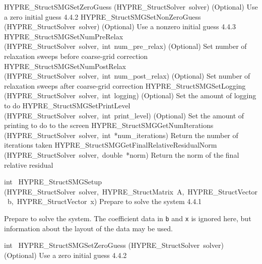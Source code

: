 \documentclass{article}
\begin{document}
\begin{cxxentry}
\begin{cxxentry}
\begin{cxxnames}
        {HYPRE\_StructSMGSetZeroGuess}
        {(HYPRE\_StructSolver\ solver)}
        {
(Optional) Use a zero initial guess}
        {4.4.2}
        {HYPRE\_StructSMGSetNonZeroGuess}
        {(HYPRE\_StructSolver\ solver)}
        {
(Optional) Use a nonzero initial guess}
        {4.4.3}
        {HYPRE\_StructSMGSetNumPreRelax}
        {(HYPRE\_StructSolver\ solver,\ int\ num\_pre\_relax)}
        {
(Optional) Set number of relaxation sweeps before coarse-grid correction}
        {}
\label{cxx.4.4.10}
        {HYPRE\_StructSMGSetNumPostRelax}
        {(HYPRE\_StructSolver\ solver,\ int\ num\_post\_relax)}
        {
(Optional) Set number of relaxation sweeps after coarse-grid correction}
        {}
\label{cxx.4.4.11}
        {HYPRE\_StructSMGSetLogging}
        {(HYPRE\_StructSolver\ solver,\ int\ logging)}
        {
(Optional) Set the amount of logging to do}
        {}
\label{cxx.4.4.12}
        {HYPRE\_StructSMGSetPrintLevel}
        {(HYPRE\_StructSolver\ solver,\ int\ print\_level)}
        {
(Optional) Set the amount of printing to do to the screen}
        {}
\label{cxx.4.4.13}
        {HYPRE\_StructSMGGetNumIterations}
        {(HYPRE\_StructSolver\ solver,\ int\ *num\_iterations)}
        {
Return the number of iterations taken}
        {}
\label{cxx.4.4.14}
        {HYPRE\_StructSMGGetFinalRelativeResidualNorm}
        {(HYPRE\_StructSolver\ solver,\ double\ *norm)}
        {
Return the norm of the final relative residual}
        {}
\label{cxx.4.4.15}
\end{cxxnames}
\begin{cxxfunction}
{int\ }
        {HYPRE\_StructSMGSetup}
        {(HYPRE\_StructSolver\ solver,\ HYPRE\_StructMatrix\ A,\ HYPRE\_StructVector\ b,\ HYPRE\_StructVector\ x)}
        {
Prepare to solve the system}
        {4.4.1}
\begin{cxxdoc}

Prepare to solve the system.  The coefficient data in {\tt b} and {\tt x} is
ignored here, but information about the layout of the data may be used.
\end{cxxdoc}
\end{cxxfunction}
\begin{cxxfunction}
{int\ }
        {HYPRE\_StructSMGSetZeroGuess}
        {(HYPRE\_StructSolver\ solver)}
        {
(Optional) Use a zero initial guess}
        {4.4.2}
\begin{cxxdoc}


\end{cxxdoc}
\end{cxxfunction}
\end{cxxentry}
\end{cxxentry}
\end{document}
